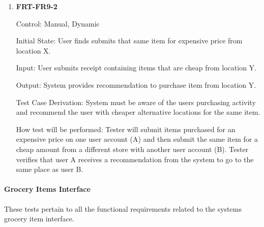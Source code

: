 \documentclass[12pt, titlepage]{article}
\begin{document}
\begin{enumerate}
\item{\textbf{FRT-FR9-2}}

Control: Manual, Dynamic
          
Initial State: User finds submits that same item for expensive price from location X.

Input: User submits receipt containing items that are cheap from location Y.
          
Output: System provides recommendation to purchase item from location Y.

Test Case Derivation: System must be aware of the users purchasing activity and recommend the user with cheaper alternative locations for the same item.
          
How test will be performed: Tester will submit items purchased for an expensive price on one user account (A) and then submit the same item for a cheap amount from a different store with another user account (B). Tester verifies that user A receives a recommendation from the system to go to the same place as user B.

\end{enumerate}

\paragraph{Grocery Items Interface}

These tests pertain to all the functional requirements related to the systems grocery item interface.
\end{document}
